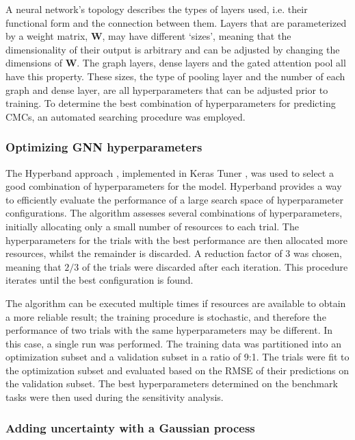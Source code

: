 A neural network's topology describes the types of layers used, i.e. their
functional form and the connection between them. Layers that are parameterized
by a weight matrix, $\mathbf{W}$, may have different `sizes', meaning that the
dimensionality of their output is arbitrary and can be adjusted by changing the
dimensions of $\mathbf{W}$. The graph layers, dense layers and the gated
attention pool all have this property. These sizes, the type of pooling layer
and the number of each graph and dense layer, are all hyperparameters that can
be adjusted prior to training. To determine the best combination of
hyperparameters for predicting CMCs, an automated searching procedure was
employed.

\subsubsection{Optimizing GNN hyperparameters}

The Hyperband approach \cite{liHyperbandNovelBanditBased2018}, implemented in
Keras Tuner \cite{cholletKeras2015}, was used to select a good combination of
hyperparameters for the model. Hyperband provides a way to efficiently evaluate
the performance of a large search space of hyperparameter configurations. The
algorithm assesses several combinations of hyperparameters, initially allocating
only a small number of resources to each trial. The hyperparameters for the
trials with the best performance are then allocated more resources, whilst the
remainder is discarded. A reduction factor of 3 was chosen, meaning that $2/3$
of the trials were discarded after each iteration. This procedure iterates until
the best configuration is found.

The algorithm can be executed multiple times if resources are available to
obtain a more reliable result; the training procedure is stochastic, and
therefore the performance of two trials with the same hyperparameters may be
different. In this case, a single run was performed. The training data was
partitioned into an optimization subset and a validation subset in a ratio of
9:1. The trials were fit to the optimization subset and evaluated based on the
RMSE of their predictions on the validation subset. The best hyperparameters
determined on the benchmark tasks were then used during the sensitivity
analysis.

\subsubsection{Adding uncertainty with a Gaussian process}

